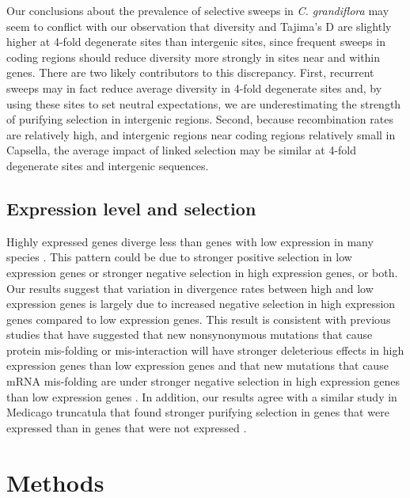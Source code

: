 Our conclusions about the prevalence of selective sweeps in \textit{C. grandiflora} may seem to conflict with our observation that diversity and Tajima's D are slightly higher at 4-fold degenerate sites than intergenic sites, since frequent sweeps in coding regions should reduce diversity more strongly in sites near and within genes. There are two likely contributors to this discrepancy. First, recurrent sweeps may in fact reduce average diversity in 4-fold degenerate sites and, by using these sites to set neutral expectations, we are underestimating the strength of purifying selection in intergenic regions. Second, because recombination rates are relatively high, and intergenic regions near coding regions relatively small in Capsella, the average impact of linked selection may be similar at 4-fold degenerate sites and intergenic sequences. 

\subsection{Expression level and selection}
	Highly expressed genes diverge less than genes with low expression in many species \citep{pal2001, subramanian2004, drummond2006,slotte2011genomic, yang2012, lemos2005,clark2007, carneiro2012}. This pattern could be due to stronger positive selection in low expression genes or stronger negative selection in high expression genes, or both. Our results suggest that variation in divergence rates between high and low expression genes is largely due to increased negative selection in high expression genes compared to low expression genes. This result is consistent with previous studies that have suggested that new nonsynonymous mutations that cause protein mis-folding or mis-interaction will have stronger deleterious effects in high expression genes than low expression genes and that new mutations that cause mRNA mis-folding are under stronger negative selection in high expression genes than low expression genes \citep{park2013, yang2012, drummond2008}. In addition, our results agree with a similar study in Medicago truncatula that found stronger purifying selection in genes that were expressed than in genes that were not expressed \citep{paape2013}. 


\section{Methods}
